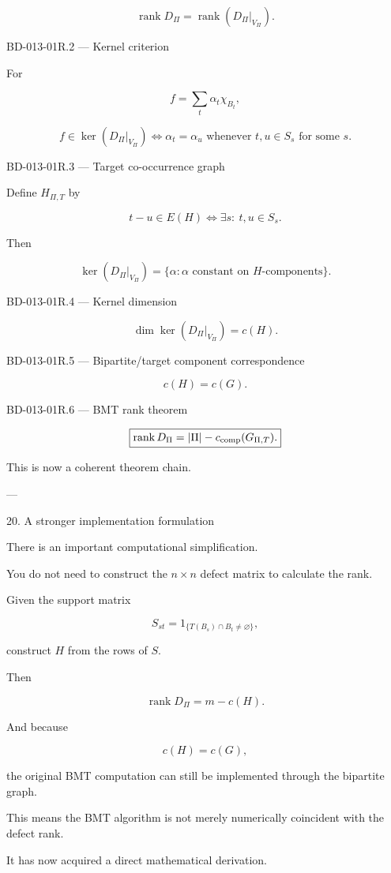 \[
\boxed{
\operatorname{rank}D_\Pi
=
\operatorname{rank}(D_\Pi|_{V_\Pi}).
}
\]

BD-013-01R.2 — Kernel criterion

For

\[
f=\sum_t\alpha_t\chi_{B_t},
\]

\[
\boxed{
f\in\ker(D_\Pi|_{V_\Pi})
\iff
\alpha_t=\alpha_u
\text{ whenever }t,u\in S_s
\text{ for some }s.
}
\]

BD-013-01R.3 — Target co-occurrence graph

Define \(H_{\Pi,T}\) by

\[
t-u\in E(H)
\iff
\exists s:\ t,u\in S_s.
\]

Then

\[
\boxed{
\ker(D_\Pi|_{V_\Pi})
=
\{\alpha:\alpha\text{ constant on }H\text{-components}\}.
}
\]

BD-013-01R.4 — Kernel dimension

\[
\boxed{
\dim\ker(D_\Pi|_{V_\Pi})=c(H).
}
\]

BD-013-01R.5 — Bipartite/target component correspondence

\[
\boxed{
c(H)=c(G).
}
\]

BD-013-01R.6 — BMT rank theorem

\[
\boxed{
\operatorname{rank}D_\Pi
=
|\Pi|-c_{\rm comp}(G_{\Pi,T}).
}
\]

This is now a coherent theorem chain.


---

20. A stronger implementation formulation

There is an important computational simplification.

You do not need to construct the \(n\times n\) defect matrix to calculate the rank.

Given the support matrix

\[
S_{st}
=
1_{\{T(B_s)\cap B_t\neq\varnothing\}},
\]

construct \(H\) from the rows of \(S\).

Then

\[
\boxed{
\operatorname{rank}D_\Pi
=
m-c(H).
}
\]

And because

\[
c(H)=c(G),
\]

the original BMT computation can still be implemented through the bipartite graph.

This means the BMT algorithm is not merely numerically coincident with the defect rank.

It has now acquired a direct mathematical derivation.


